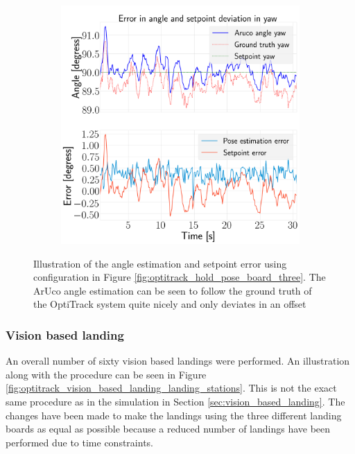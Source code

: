 \documentclass[../Head/report.tex]{subfiles}
\begin{document}
\begin{figure}[H]
\begin{subfigure}[t]{.30\textwidth}
        \caption{}
        \label{fig:optitrack_hold_pose_using_estimated_aruco_pose_error_pitch_test_five}
    \end{subfigure}
     \hspace{0.2em}
    \begin{subfigure}[t]{.30\textwidth}
        \centering
        \includegraphics[width=\textwidth]{../Figures/optitrack/hold_pose_using_estimated_aruco_pose/pose_error_yaw_test5.png}
        \caption{}
        \label{fig:optitrack_hold_pose_using_estimated_aruco_pose_error_yaw_test_five}
    \end{subfigure}
    \caption{Illustration of the angle estimation and setpoint error using configuration in Figure \ref{fig:optitrack_hold_pose_board_three}. The ArUco angle estimation can be seen to follow the ground truth of the OptiTrack system quite nicely and only deviates in an offset}
    \label{fig:optitrack_hold_pose_using_estimated_aruco_pose_error_ori_test_five}
\end{figure}

\subsubsection{Vision based landing}
\label{sec:optitrack_vision_based_landing}

An overall number of sixty vision based landings were performed. An illustration along with the procedure can be seen in Figure \ref{fig:optitrack_vision_based_landing_landing_stations}. This is not the exact same procedure as in the simulation in Section \ref{sec:vision_based_landing}. The changes have been made to make the landings using the three different landing boards as equal as possible because a reduced number of landings have been performed due to time constraints. 
\end{document}
